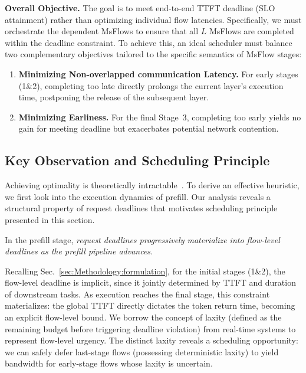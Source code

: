 \textbf{Overall Objective. } The goal is to meet end-to-end TTFT deadline (SLO attainment) rather than optimizing individual flow latencies. Specifically, we must orchestrate the dependent MsFlows to ensure that all $L$ MsFlows are completed within the deadline constraint. To achieve this, an ideal scheduler must balance two complementary objectives tailored to the specific semantics of MsFlow stages:
\begin{enumerate}[label=(\roman*),leftmargin=*,itemsep=0.5pt]
    \item \textbf{Minimizing Non-overlapped communication Latency.} For early stages (1\&2), completing too late directly prolongs the current layer's execution time, postponing the release of the subsequent layer.
    \item \textbf{Minimizing Earliness.} For the final Stage~3, completing too early yields no gain for meeting deadline but exacerbates potential network contention.
\end{enumerate}

\subsection{Key Observation and Scheduling Principle}


Achieving optimality is theoretically intractable~\cite{bettati1990algorithms,bettati1992end}. To derive an effective heuristic, we first look into the execution dynamics of prefill. Our analysis reveals a structural property of request deadlines that motivates scheduling principle presented in this section.

In the prefill stage, \emph{request deadlines progressively materialize into flow-level deadlines as the prefill pipeline advances.}

Recalling Sec.~\ref{sec:Methodology:formulation}, for the initial stages (1\&2), the flow-level deadline is implicit, since it jointly determined by TTFT and duration of downstream tasks. As execution reaches the final stage, this constraint materializes: the global TTFT directly dictates the token return time, becoming an explicit flow-level bound. We borrow the concept of laxity (defined as the remaining budget before triggering deadline violation) from real-time systems to represent flow-level urgency. The distinct laxity reveals a scheduling opportunity: we can safely defer last-stage flows (possessing deterministic laxity) to yield bandwidth for early-stage flows whose laxity is uncertain.

